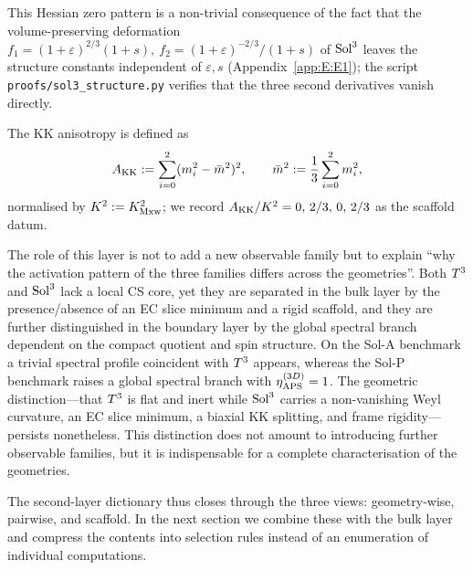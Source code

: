 This Hessian zero pattern is a non-trivial consequence of the fact that the
volume-preserving deformation
$f_1=(1+\varepsilon)^{2/3}(1+s),\ f_2=(1+\varepsilon)^{-2/3}/(1+s)$
of $\mathrm{Sol}^3$ leaves the structure constants independent of $\varepsilon, s$
(Appendix~\ref{app:E:E1}); the script \texttt{proofs/sol3\_structure.py}
verifies that the three second derivatives vanish directly.

The KK anisotropy is defined as
\begin{equation}
  A_{\mathrm{KK}} := \sum_{i=0}^{2}(m_i^2-\bar m^2)^2,
  \qquad
  \bar m^2 := \frac{1}{3}\sum_{i=0}^{2} m_i^2,
\end{equation}
normalised by $K^2 := K_{\mathrm{Mxw}}^2$; we record
$A_{\mathrm{KK}}/K^2 = 0,\,2/3,\,0,\,2/3$ as the scaffold datum.

The role of this layer is not to add a new observable family but to explain
``why the activation pattern of the three families differs across the
geometries''.  Both $T^3$ and $\mathrm{Sol}^3$ lack a local CS core, yet they
are separated in the bulk layer by the presence/absence of an EC slice
minimum and a rigid scaffold, and they are further distinguished in the
boundary layer by the global spectral branch dependent on the compact
quotient and spin structure.  On the Sol-A benchmark a trivial spectral
profile coincident with $T^3$ appears, whereas the Sol-P benchmark
raises a global spectral branch with $\eta_{\mathrm{APS}}^{(3D)} = 1$.  The geometric
distinction---that $T^3$ is flat and inert while $\mathrm{Sol}^3$ carries a
non-vanishing Weyl curvature, an EC slice minimum, a biaxial KK splitting,
and frame rigidity---persists nonetheless.  This distinction does not
amount to introducing further observable families, but it is indispensable
for a complete characterisation of the geometries.

The second-layer dictionary thus closes through the three views:
geometry-wise, pairwise, and scaffold.  In the next section we combine these
with the bulk layer and compress the contents into selection rules instead of
an enumeration of individual computations.
